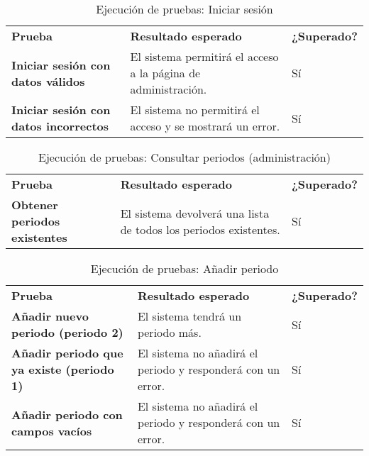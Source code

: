 \begin{table}[H]
\vspace{-4mm}
  \centering
  \caption{Ejecución de pruebas: Iniciar sesión}
    \begin{tabular}{p{9em}p{22em}p{5em}}
    \toprule
    \rowcolor[rgb]{ .851,  .886,  .953} \multicolumn{3}{p{36em}}{\textbf{Iniciar sesión}} \\ \midrule
    \rowcolor[rgb]{ .949,  .949,  .949} \textbf{Prueba} & \textbf{Resultado esperado} & \textbf{¿Superado?} \\ \midrule
    \textbf{Iniciar sesión con datos válidos } & El sistema permitirá el acceso a la página de administración.  & Sí \\ \midrule
    \textbf{Iniciar sesión con datos incorrectos} & El sistema no permitirá el acceso y se mostrará un error.  & Sí \\ \bottomrule
    \end{tabular}%
\end{table}%
\begin{table}[H]
\vspace{-4mm}
  \centering
  \caption{Ejecución de pruebas: Consultar periodos (administración)}
    \begin{tabular}{p{9em}p{22em}p{5em}}
    \toprule
    \rowcolor[rgb]{ .851,  .886,  .953} \multicolumn{3}{p{36em}}{\textbf{Consultar periodos (administración)}} \\ \midrule
    \rowcolor[rgb]{ .949,  .949,  .949} \textbf{Prueba} & \textbf{Resultado esperado} & \textbf{¿Superado?} \\ \midrule
    \textbf{Obtener periodos existentes} & El sistema devolverá una lista de todos los periodos existentes.  & Sí \\ \bottomrule
    \end{tabular}%
\end{table}%
\begin{table}[H]
\vspace{-4mm}
  \centering
  \caption{Ejecución de pruebas: Añadir periodo}
    \begin{tabular}{p{8em}p{23em}p{5em}}
    \toprule
    \rowcolor[rgb]{ .851,  .886,  .953} \multicolumn{3}{p{36em}}{\textbf{Añadir periodo}} \\ \midrule
    \rowcolor[rgb]{ .949,  .949,  .949} \textbf{Prueba} & \textbf{Resultado esperado} & \textbf{¿Superado?} \\ \midrule
    \textbf{Añadir nuevo periodo (periodo 2)} & El sistema tendrá un periodo más.  & Sí \\ \midrule
    \textbf{Añadir periodo que ya existe (periodo 1)} & El sistema no añadirá el periodo y responderá con un error.  & Sí  \\ \midrule
    \textbf{Añadir periodo con campos vacíos} & El sistema no añadirá el periodo y responderá con un error.  & Sí \\ \bottomrule
    \end{tabular}%
\end{table}%
